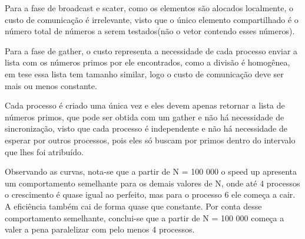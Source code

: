 Para a fase de broadcast e scater, como os elementos são alocados localmente, o custo de comunicação é irrelevante, visto que o único elemento compartilhado é o número total de números a serem testados(não o vetor contendo esses números). 

Para a fase de gather, o custo representa a necessidade de cada processo enviar a lista com os números primos por ele encontrados, como a divisão é homogênea, em tese essa lista tem tamanho similar, logo o custo de comunicação deve ser mais ou menos constante.

Cada processo é criado uma única vez e eles devem apenas retornar a lista de números primos, que pode ser obtida com um gather e não há necessidade de sincronização, visto que cada processo é independente e não há necessidade de esperar por outros processos, pois eles só buscam por primos dentro do intervalo que lhes foi atribuído.

Observando as curvas, nota-se que a partir de N = 100 000 o speed up apresenta um comportamento semelhante para os demais valores de N, onde até 4 processos o crescimento é quase igual ao perfeito, mas para o processo 6 ele começa a cair. A eficiência também cai de forma quase que constante. Por conta desse comportamento semelhante, conclui-se que a partir de N = 100 000 começa a valer a pena paralelizar com pelo menos 4 processos.

